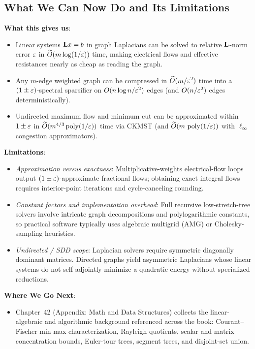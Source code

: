 \subsection{What We Can Now Do and Its Limitations}
\begin{connectionbox}
\textbf{What this gives us}:
\begin{itemize}
  \item Linear systems $\mathbf{L} x = b$ in graph Laplacians can be solved to relative $\mathbf{L}$-norm error $\varepsilon$ in $\widetilde{O}(m \log(1/\varepsilon))$ time, making electrical flows and effective resistances nearly as cheap as reading the graph.
  \item Any $m$-edge weighted graph can be compressed in $\widetilde{O}(m/\varepsilon^2)$ time into a $(1 \pm \varepsilon)$-spectral sparsifier on $O(n \log n / \varepsilon^2)$ edges (and $O(n/\varepsilon^2)$ edges deterministically).
  \item Undirected maximum flow and minimum cut can be approximated within $1 \pm \varepsilon$ in $\widetilde{O}(m^{4/3}\operatorname{poly}(1/\varepsilon))$ time via CKMST (and $\widetilde{O}(m\,\operatorname{poly}(1/\varepsilon))$ with $\ell_\infty$ congestion approximators).
\end{itemize}

\textbf{Limitations}:
\begin{itemize}
  \item \emph{Approximation versus exactness}: Multiplicative-weights electrical-flow loops output $(1 \pm \varepsilon)$-approximate fractional flows; obtaining exact integral flows requires interior-point iterations and cycle-canceling rounding.
  \item \emph{Constant factors and implementation overhead}: Full recursive low-stretch-tree solvers involve intricate graph decompositions and polylogarithmic constants, so practical software typically uses algebraic multigrid (AMG) or Cholesky-sampling heuristics.
  \item \emph{Undirected / SDD scope}: Laplacian solvers require symmetric diagonally dominant matrices. Directed graphs yield asymmetric Laplacians whose linear systems do not self-adjointly minimize a quadratic energy without specialized reductions.
\end{itemize}

\textbf{Where We Go Next}:
\begin{itemize}
  \item Chapter~42 (Appendix: Math and Data Structures) collects the linear-algebraic and algorithmic background referenced across the book: Courant--Fischer min-max characterization, Rayleigh quotients, scalar and matrix concentration bounds, Euler-tour trees, segment trees, and disjoint-set union.
\end{itemize}
\end{connectionbox}

